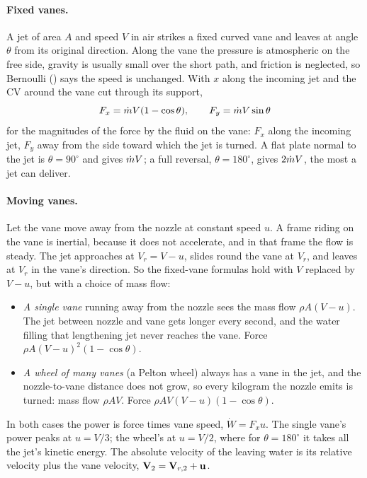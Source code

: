 \paragraph{Fixed vanes.} A jet of area $A$ and speed $V$ in air strikes a fixed curved vane and leaves at angle $\theta$ from its original direction. Along the vane the pressure is atmospheric on the free side, gravity is usually small over the short path, and friction is neglected, so Bernoulli () says the speed is unchanged. With $x$ along the incoming jet and the CV around the vane cut through its support,
\[
F_x = \dot m V(1 - \cos\theta),\qquad F_y = \dot m V\sin\theta
\]
for the magnitudes of the force by the fluid on the vane: $F_x$ along the incoming jet, $F_y$ away from the side toward which the jet is turned. A flat plate normal to the jet is $\theta = 90^\circ$ and gives $\dot m V$; a full reversal, $\theta = 180^\circ$, gives $2\dot m V$, the most a jet can deliver.

\paragraph{Moving vanes.} Let the vane move away from the nozzle at constant speed $u$. A frame riding on the vane is inertial, because it does not accelerate, and in that frame the flow is steady. The jet approaches at $V_r = V - u$, slides round the vane at $V_r$, and leaves at $V_r$ in the vane's direction. So the fixed-vane formulas hold with $V$ replaced by $V - u$, but with a choice of mass flow:
\begin{itemize}[nosep,leftmargin=*]
\item \emph{A single vane} running away from the nozzle sees the mass flow $\rho A(V - u)$. The jet between nozzle and vane gets longer every second, and the water filling that lengthening jet never reaches the vane. Force $\rho A(V - u)^2(1 - \cos\theta)$.
\item \emph{A wheel of many vanes} (a Pelton wheel) always has a vane in the jet, and the nozzle-to-vane distance does not grow, so every kilogram the nozzle emits is turned: mass flow $\rho AV$. Force $\rho AV(V - u)(1 - \cos\theta)$.
\end{itemize}
In both cases the power is force times vane speed, $\dot W = F_xu$. The single vane's power peaks at $u = V/3$; the wheel's at $u = V/2$, where for $\theta = 180^\circ$ it takes all the jet's kinetic energy. The absolute velocity of the leaving water is its relative velocity plus the vane velocity, $\mathbf{V}_2 = \mathbf{V}_{r,2} + \mathbf{u}$.

